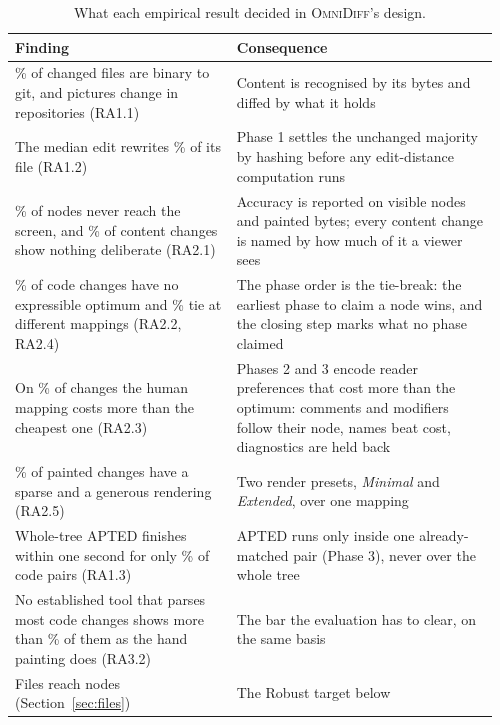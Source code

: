 \documentclass[sigconf,review]{acmart}
\begin{document}
\begin{table}
  \caption{What each empirical result decided in \textsc{OmniDiff}'s design.}
  \label{tab:findings-to-design}
  \small
  \begin{tabular}{@{}>{\raggedright\arraybackslash}p{0.44\linewidth}>{\raggedright\arraybackslash}p{0.52\linewidth}@{}}
    \toprule
    Finding & Consequence \\
    \midrule
    \ChangeCensusBinaryPct{}\% of changed files are binary to git, and pictures change in
      \ContentCensusPicturesRepos{} repositories (RA1.1)
      & Content is recognised by its bytes and diffed by what it holds \\ \addlinespace
    The median edit rewrites \EditsChurnPFiftyPct{}\% of its file (RA1.2)
      & Phase 1 settles the unchanged majority by hashing before any edit-distance computation
        runs \\ \addlinespace
    \InvisibleNodeShare{}\% of nodes never reach the screen, and \ContentVerdictNothingPct{}\%
      of content changes show nothing deliberate (RA2.1)
      & Accuracy is reported on visible nodes and painted bytes; every content change is named
        by how much of it a viewer sees \\ \addlinespace
    \AmbiguityListPct{}\% of code changes have no expressible optimum and
      \CostTieDifferentPct{}\% tie at different mappings (RA2.2, RA2.4)
      & The phase order is the tie-break: the earliest phase to claim a node wins, and the
        closing step marks what no phase claimed \\ \addlinespace
    On \CostHumanHigherPct{}\% of changes the human mapping costs more than the cheapest one
      (RA2.3)
      & Phases 2 and 3 encode reader preferences that cost more than the optimum: comments and
        modifiers follow their node, names beat cost, diagnostics are held back \\ \addlinespace
    \PresetBothPct{}\% of painted changes have a sparse and a generous rendering (RA2.5)
      & Two render presets, \emph{Minimal} and \emph{Extended}, over one mapping \\ \addlinespace
    Whole-tree APTED finishes within one second for only \RqOneCodePct{}\% of code pairs (RA1.3)
      & APTED runs only inside one already-matched pair (Phase 3), never over the whole tree \\ \addlinespace
    No established tool that parses most code changes shows more than
      \DifftasticPaintingLinePerfectPct{}\% of them as the hand painting does (RA3.2)
      & The bar the evaluation has to clear, on the same basis \\ \addlinespace
    Files reach \AstMax{} nodes (Section~\ref{sec:files})
      & The Robust target below \\
    \bottomrule
  \end{tabular}
\end{table}
\end{document}
